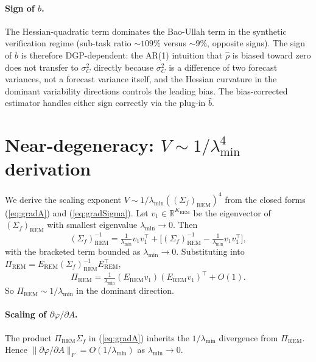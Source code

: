 \documentclass[11pt,letterpaper]{article}
\theoremstyle{remark}
\newcommand{\REM}{\mathrm{REM}}
\newcommand{\Sigmaf}{\Sigma_f}
\newcommand{\PiREM}{\Pi_{\REM}}
\newcommand{\sigC}{\sigma^2_C}
\begin{document}
\paragraph{Sign of $b$.} The Hessian-quadratic term dominates the Bao-Ullah term in the synthetic verification regime (sub-task ratio $\sim 109\%$ versus $\sim 9\%$, opposite signs). The sign of $b$ is therefore DGP-dependent: the AR(1) intuition that $\widehat\rho$ is biased toward zero does not transfer to $\sigC$ directly because $\sigC$ is a difference of two forecast variances, not a forecast variance itself, and the Hessian curvature in the dominant variability directions controls the leading bias. The bias-corrected estimator handles either sign correctly via the plug-in $\widehat{b}$.

\section{\texorpdfstring{Near-degeneracy: $V \sim 1/\lambda_{\min}^4$ derivation}{Near-degeneracy: V scales as 1/lambda\_min\textasciicircum 4 derivation}}\label{app:F}

We derive the scaling exponent $V \sim 1/\lambda_{\min}((\Sigmaf)_\REM)^4$ from the closed forms (\ref{eq:gradA}) and (\ref{eq:gradSigma}). Let $v_1 \in \mathbb{R}^{K_\REM}$ be the eigenvector of $(\Sigmaf)_\REM$ with smallest eigenvalue $\lambda_{\min} \to 0$. Then
\begin{equation*}
(\Sigmaf)_\REM^{-1} = \tfrac{1}{\lambda_{\min}} v_1 v_1^\top + \big[(\Sigmaf)_\REM^{-1} - \tfrac{1}{\lambda_{\min}} v_1 v_1^\top\big],
\end{equation*}
with the bracketed term bounded as $\lambda_{\min} \to 0$. Substituting into $\PiREM = E_\REM (\Sigmaf)_\REM^{-1} E_\REM^\top$,
\begin{equation*}
\PiREM = \tfrac{1}{\lambda_{\min}} (E_\REM v_1)(E_\REM v_1)^\top + O(1).
\end{equation*}
So $\PiREM \sim 1/\lambda_{\min}$ in the dominant direction.

\paragraph{Scaling of $\partial \varphi / \partial A$.} The product $\PiREM \Sigmaf$ in (\ref{eq:gradA}) inherits the $1/\lambda_{\min}$ divergence from $\PiREM$. Hence $\|\partial \varphi / \partial A\|_F = O(1/\lambda_{\min})$ as $\lambda_{\min} \to 0$.
\end{document}
